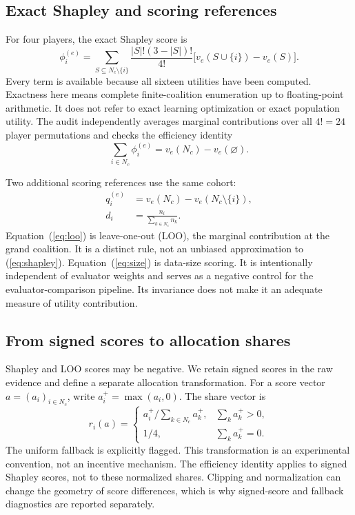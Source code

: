\documentclass[conference,letterpaper]{IEEEtran}
\begin{document}
\subsection{Exact Shapley and scoring references}
For four players, the exact Shapley score is
\begin{equation}
\phi_i^{(e)}=\sum_{S\subseteq N_c\setminus\{i\}}
\frac{|S|!(3-|S|)!}{4!}
\big[v_e(S\cup\{i\})-v_e(S)\big].
\label{eq:shapley}
\end{equation}
Every term is available because all sixteen utilities have been computed. Exactness here means complete finite-coalition enumeration up to floating-point arithmetic. It does not refer to exact learning optimization or exact population utility. The audit independently averages marginal contributions over all $4!=24$ player permutations and checks the efficiency identity
\begin{equation}
\sum_{i\in N_c}\phi_i^{(e)}=v_e(N_c)-v_e(\varnothing).
\label{eq:efficiency}
\end{equation}

Two additional scoring references use the same cohort:
\begin{align}
q_i^{(e)}&=v_e(N_c)-v_e(N_c\setminus\{i\}),\label{eq:loo}\\
d_i&=\frac{n_i}{\sum_{k\in N_c}n_k}.\label{eq:size}
\end{align}
Equation~(\ref{eq:loo}) is leave-one-out (LOO), the marginal contribution at the grand coalition. It is a distinct rule, not an unbiased approximation to (\ref{eq:shapley}). Equation~(\ref{eq:size}) is data-size scoring. It is intentionally independent of evaluator weights and serves as a negative control for the evaluator-comparison pipeline. Its invariance does not make it an adequate measure of utility contribution.

\subsection{From signed scores to allocation shares}
Shapley and LOO scores may be negative. We retain signed scores in the raw evidence and define a separate allocation transformation. For a score vector $a=(a_i)_{i\in N_c}$, write $a_i^+=\max(a_i,0)$. The share vector is
\begin{equation}
r_i(a)=\begin{cases}
\displaystyle a_i^+/\sum_{k\in N_c}a_k^+,&\sum_k a_k^+>0,\\
1/4,&\sum_k a_k^+=0.
\end{cases}
\label{eq:allocation}
\end{equation}
The uniform fallback is explicitly flagged. This transformation is an experimental convention, not an incentive mechanism. The efficiency identity applies to signed Shapley scores, not to these normalized shares. Clipping and normalization can change the geometry of score differences, which is why signed-score and fallback diagnostics are reported separately.
\end{document}
